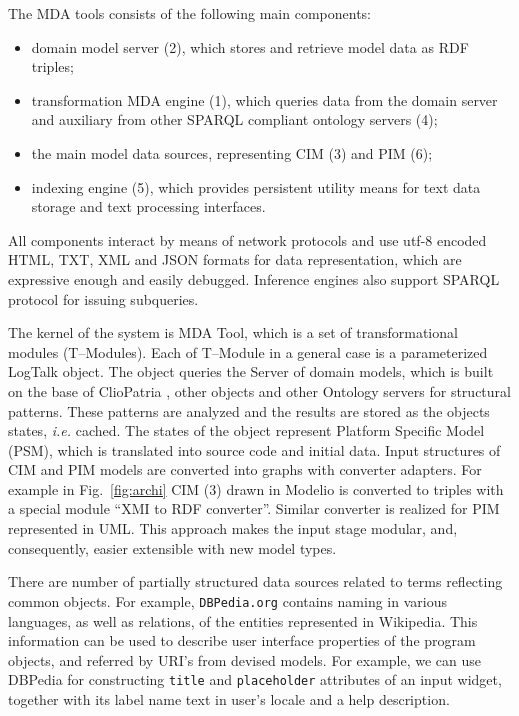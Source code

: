 \documentclass[conference]{IEEEtran}
\begin{document}
The MDA tools consists of the following main components:
\begin{itemize}
\item domain model server (2), which stores and retrieve model data as RDF triples;
\item transformation MDA engine (1), which queries data from the domain server and auxiliary from other SPARQL compliant ontology servers (4);
\item the main model data sources, representing CIM (3) and PIM (6);
\item indexing engine (5), which provides persistent utility means for text data storage and text processing interfaces.
\end{itemize}

All components interact by means of network protocols and use utf-8 encoded HTML, TXT, XML and JSON formats for data representation, which are expressive enough and easily debugged.  Inference engines also support SPARQL protocol for issuing subqueries.

The kernel of the system is MDA Tool, which is a set of transformational modules (T--Modules). Each of T--Module in a general case is a parameterized LogTalk object.  The object queries the Server of domain models, which is built on the base of ClioPatria \cite{Clio}, other objects and other Ontology servers for structural patterns.  These patterns are analyzed and the results are stored as the objects states, \emph{i.e.} cached.  The states of the object represent Platform Specific Model (PSM), which is translated into source code and initial data.  Input structures of CIM and PIM models are converted into graphs with converter adapters.  For example in Fig.~\ref{fig:archi} CIM (3) drawn in Modelio \cite{modelio} is converted to triples with a special module ``XMI to RDF converter''.  Similar converter is realized for PIM represented in UML.  This approach makes the input stage modular, and, consequently, easier extensible with new model types.


There are number of partially structured data sources related to terms reflecting common objects.  For example, \texttt{DBPedia.org} contains naming in various languages, as well as relations, of the entities represented in Wikipedia.  This information can be used to describe user interface properties of the program objects, and referred by URI's from devised models.  For example, we can use DBPedia for constructing \texttt{title} and \texttt{placeholder} attributes of an input widget, together with its label name text in user's locale and a help description.
\end{document}
